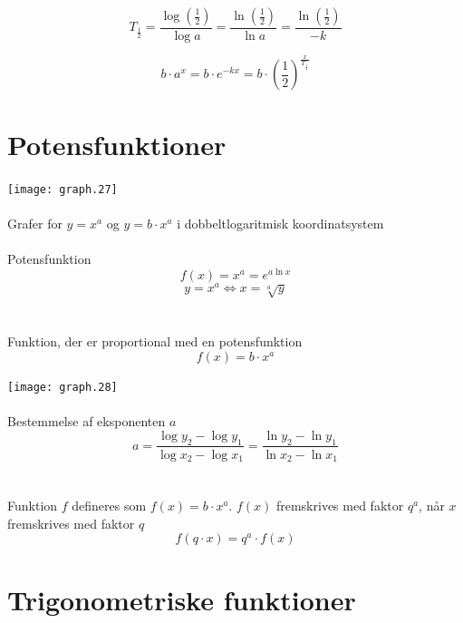 \documentclass[11pt,a5paper,fleqn,leqno]{book}
\begin{document}
\begin{equation}
T_{\frac{1}{2}} = \frac{\log\left(\frac{1}{2}\right)}{\log a} = \frac{\ln\left(\frac{1}{2}\right)}{\ln a} = \frac{\ln\left(\frac{1}{2}\right)}{-k}
\end{equation}

\begin{equation}
b \cdot a^x = b \cdot e^{-kx} = b \cdot \left(\frac{1}{2}\right)^{\frac{x}{T_{\frac{1}{2}}}}
\end{equation}

\newpage

\section{Potensfunktioner}

\texttt{[image: graph.27]}
\\
\\
Grafer for $y = x^a$ og $y = b \cdot x^a$ i dobbeltlogaritmisk koordinatsystem
\\
\\
Potensfunktion
\begin{equation}
f(x) = x^a = e^{a\ln x}
\end{equation}
\begin{equation}
y = x^a \Leftrightarrow x = \sqrt[a]{y}
\end{equation}
\\
\\
Funktion, der er proportional med en potensfunktion
\begin{equation}
f(x) = b \cdot x^a
\end{equation}

\newpage

\texttt{[image: graph.28]}
\\
\\
Bestemmelse af eksponenten $a$
\begin{equation}
a = \frac{\log y_2 - \log y_1}{\log x_2 - \log x_1} = \frac{\ln y_2 - \ln y_1}{\ln x_2 - \ln x_1}
\end{equation}
\\
\\
Funktion $f$ defineres som $f(x) = b \cdot x^a$. $f(x)$ fremskrives med faktor $q^a$, når $x$ fremskrives med faktor $q$
\begin{equation}
f(q \cdot x) = q^a \cdot f(x)
\end{equation}

\vfill

\section{Trigonometriske funktioner}
\end{document}
